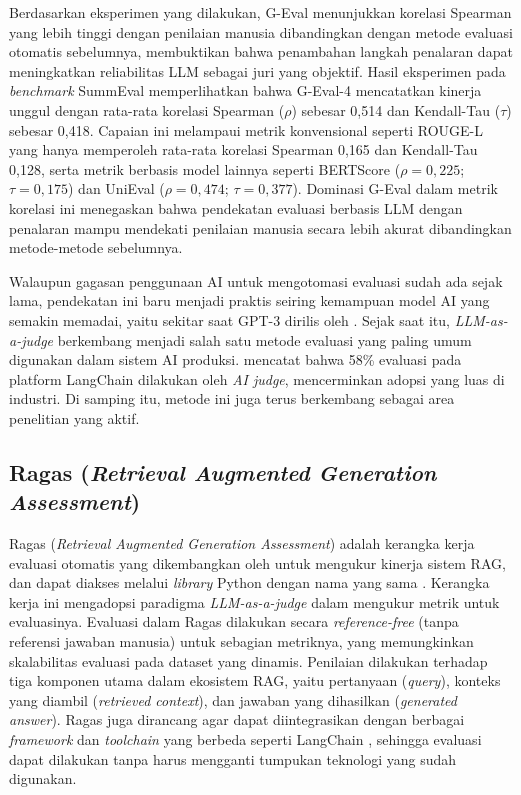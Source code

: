 Berdasarkan eksperimen yang dilakukan, G-Eval menunjukkan korelasi Spearman yang lebih tinggi dengan penilaian manusia dibandingkan dengan metode evaluasi otomatis sebelumnya, membuktikan bahwa penambahan langkah penalaran dapat meningkatkan reliabilitas LLM sebagai juri yang objektif. Hasil eksperimen pada \textit{benchmark} SummEval memperlihatkan bahwa G-Eval-4 mencatatkan kinerja unggul dengan rata-rata korelasi Spearman ($\rho$) sebesar 0,514 dan Kendall-Tau ($\tau$) sebesar 0,418. Capaian ini melampaui metrik konvensional seperti ROUGE-L yang hanya memperoleh rata-rata korelasi Spearman 0,165 dan Kendall-Tau 0,128, serta metrik berbasis model lainnya seperti BERTScore ($\rho=0,225$; $\tau=0,175$) dan UniEval ($\rho=0,474$; $\tau=0,377$). Dominasi G-Eval dalam metrik korelasi ini menegaskan bahwa pendekatan evaluasi berbasis LLM dengan penalaran mampu mendekati penilaian manusia secara lebih akurat dibandingkan metode-metode sebelumnya.

Walaupun gagasan penggunaan AI untuk mengotomasi evaluasi sudah ada sejak lama, pendekatan ini baru menjadi praktis seiring kemampuan model AI yang semakin memadai, yaitu sekitar saat GPT-3 dirilis oleh \textcite{brownLanguageModelsAre2020} \parencite{huyenAIEngineeringBuilding2025}. Sejak saat itu, \textit{LLM-as-a-judge} berkembang menjadi salah satu metode evaluasi yang paling umum digunakan dalam sistem AI produksi. \textcite{langchain_state_of_ai_2023} mencatat bahwa 58\% evaluasi pada platform LangChain dilakukan oleh \textit{AI judge}, mencerminkan adopsi yang luas di industri. Di samping itu, metode ini juga terus berkembang sebagai area penelitian yang aktif.

\subsection{Ragas (\textit{Retrieval Augmented Generation Assessment})}
Ragas (\textit{Retrieval Augmented Generation Assessment}) adalah kerangka kerja evaluasi otomatis yang dikembangkan oleh \textcite{esRagasAutomatedEvaluation2025} untuk mengukur kinerja sistem RAG, dan dapat diakses melalui \textit{library} Python dengan nama yang sama \parencite{ragas2024}. Kerangka kerja ini mengadopsi paradigma \textit{LLM-as-a-judge} dalam mengukur metrik untuk evaluasinya. Evaluasi dalam Ragas dilakukan secara \textit{reference-free} (tanpa referensi jawaban manusia) untuk sebagian metriknya, yang memungkinkan skalabilitas evaluasi pada dataset yang dinamis. Penilaian dilakukan terhadap tiga komponen utama dalam ekosistem RAG, yaitu pertanyaan (\textit{query}), konteks yang diambil (\textit{retrieved context}), dan jawaban yang dihasilkan (\textit{generated answer}). Ragas juga dirancang agar dapat diintegrasikan dengan berbagai \textit{framework} dan \textit{toolchain} yang berbeda seperti LangChain \parencite{langchainaiLangChain2025}, sehingga evaluasi dapat dilakukan tanpa harus mengganti tumpukan teknologi yang sudah digunakan.

